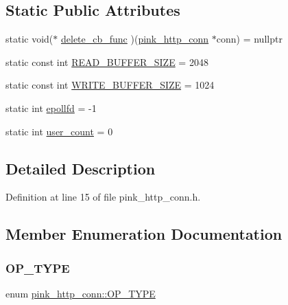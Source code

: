 \subsection*{Static Public Attributes}
\begin{DoxyCompactItemize}
\item 
static void($\ast$ \hyperlink{classpink__http__conn_a36a48a19aa593001494eb51106628ebd}{delete\+\_\+cb\+\_\+func} )(\hyperlink{classpink__http__conn}{pink\+\_\+http\+\_\+conn} $\ast$conn) = nullptr
\item 
static const int \hyperlink{classpink__http__conn_a240ddaa8b2707d66601b1b82c002ef96}{R\+E\+A\+D\+\_\+\+B\+U\+F\+F\+E\+R\+\_\+\+S\+I\+ZE} = 2048
\item 
static const int \hyperlink{classpink__http__conn_a7764e0564be1e1ae66c44cf34550efea}{W\+R\+I\+T\+E\+\_\+\+B\+U\+F\+F\+E\+R\+\_\+\+S\+I\+ZE} = 1024
\item 
static int \hyperlink{classpink__http__conn_a106c011c818e2a80dbb14c61abbe9a2a}{epollfd} = -\/1
\item 
static int \hyperlink{classpink__http__conn_a4796952e9f7dc2a940e5681bc8f04139}{user\+\_\+count} = 0
\end{DoxyCompactItemize}


\subsection{Detailed Description}


Definition at line 15 of file pink\+\_\+http\+\_\+conn.\+h.



\subsection{Member Enumeration Documentation}
\mbox{\label{classpink__http__conn_a7959fd18f89efd188dcbc662ff65ddcb}} 
\subsubsection{\texorpdfstring{O\+P\+\_\+\+T\+Y\+PE}{OP\_TYPE}}
{\footnotesize\ttfamily enum \hyperlink{classpink__http__conn_a7959fd18f89efd188dcbc662ff65ddcb}{pink\+\_\+http\+\_\+conn\+::\+O\+P\+\_\+\+T\+Y\+PE}}

